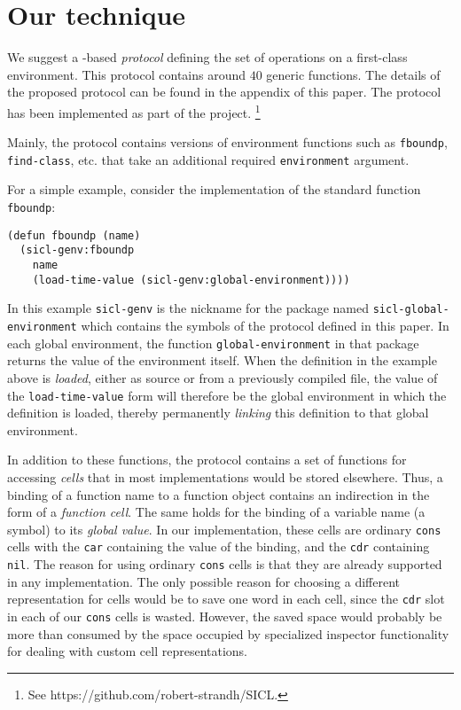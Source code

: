 \section{Our technique}

We suggest a \clos{}-based \emph{protocol} defining the set of
operations on a first-class environment.  This protocol contains
around $40$ generic functions.  The details of the proposed protocol
can be found in the appendix of this paper.  The protocol has been
implemented as part of the \sicl{} project.%
\footnote{See https://github.com/robert-strandh/SICL.}

Mainly, the protocol contains versions of \commonlisp{} environment
functions such as \texttt{fboundp}, \texttt{find-class}, etc. that
take an additional required \texttt{environment} argument.

For a simple example, consider the \sicl{} implementation of the
standard \commonlisp{} function \texttt{fboundp}:

{\small\begin{verbatim}
(defun fboundp (name)
  (sicl-genv:fboundp
    name
    (load-time-value (sicl-genv:global-environment))))
\end{verbatim}}

In this example \texttt{sicl-genv} is the nickname for the package
named \texttt{sicl-global-environment} which contains the symbols of
the protocol defined in this paper.  In each global environment, the
function \texttt{global-environment} in that package returns
the value of the environment itself.  When the definition in the
example above is \emph{loaded}, either as source or from a previously
compiled file, the value of the \texttt{load-time-value} form will
therefore be the global environment in which the definition is loaded,
thereby permanently \emph{linking} this definition to that global
environment.

In addition to these functions, the protocol contains a set of
functions for accessing \emph{cells} that in most implementations
would be stored elsewhere.  Thus, a binding of a function name to a
function object contains an indirection in the form of a
\emph{function cell}.  The same holds for the binding of a variable
name (a symbol) to its \emph{global value}.  In our implementation,
these cells are ordinary \texttt{cons} cells with the \texttt{car}
containing the value of the binding, and the \texttt{cdr} containing
\texttt{nil}.  The reason for using ordinary \texttt{cons} cells is
that they are already supported in any \commonlisp{} implementation.
The only possible reason for choosing a different representation for
cells would be to save one word in each cell, since the \texttt{cdr}
slot in each of our \texttt{cons} cells is wasted.  However, the saved
space would probably be more than consumed by the space occupied by
specialized inspector functionality for dealing with custom cell
representations.

